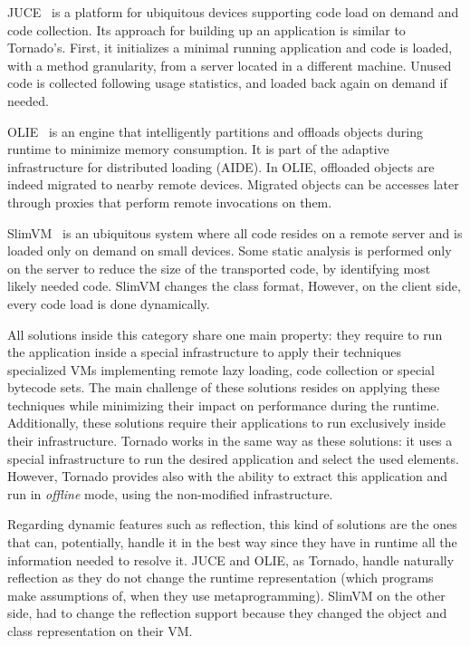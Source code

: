 JUCE~\cite{ShortPopa04a,ShortTeod01a} is a platform for ubiquitous devices supporting code load on demand and code collection. Its approach for building up an application is similar to Tornado's. First, it initializes a minimal running application and code is loaded, with a method granularity, from a server located in a different machine. Unused code is collected following usage statistics, and loaded back again on demand if needed.

OLIE~\cite{Gu03a} is an engine that intelligently partitions and offloads objects during runtime to minimize memory consumption. It is part of the adaptive infrastructure for distributed loading (AIDE). In OLIE, offloaded objects are indeed migrated to nearby remote devices. Migrated objects can be accesses later through proxies that perform remote invocations on them.

SlimVM~\cite{Kers09a, Wagn11a} is an ubiquitous system where all code resides on a remote server and is loaded only on demand on small devices. Some static analysis is performed only on the server to reduce the size of the transported code, by identifying most likely needed code. SlimVM changes the class format,  However, on the client side, every code load is done dynamically.

All solutions inside this category share one main property: they require to run the application inside a special infrastructure to apply their techniques \eg specialized VMs implementing remote lazy loading, code collection or special bytecode sets. The main challenge of these solutions resides on applying these techniques while minimizing their impact on performance during the runtime. Additionally, these solutions require their applications to run exclusively inside their infrastructure. Tornado works in the same way as these solutions: it uses a special infrastructure to run the desired application and select the used elements.  However, Tornado provides also with the ability to extract this application and run in \emph{offline} mode, using the non-modified infrastructure.

Regarding dynamic features such as reflection, this kind of solutions are the ones that can, potentially, handle it in the best way since they have in runtime all the information needed to resolve it. JUCE and OLIE, as Tornado, handle naturally reflection as they do not change the runtime representation (which programs make assumptions of, when they use metaprogramming). SlimVM on the other side, had to change the reflection support because they changed the object and class representation on their VM.

